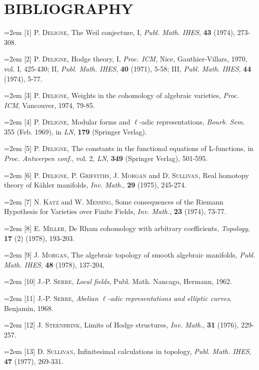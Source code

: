 \documentclass[11pt,leqno]{article}
\begin{document}
\section*{BIBLIOGRAPHY}

{\small
\noindent\hangindent=2em
[1] P. \textsc{Deligne}, The Weil conjecture, I, \textit{Publ. Math. IHES}, \textbf{43} (1974), 273-308.

\noindent\hangindent=2em
[2] P. \textsc{Deligne}, Hodge theory, I, \textit{Proc. ICM}, Nice, Gauthier-Villars, 1970, vol. I, 425-430; II, \textit{Publ. Math. IHES}, \textbf{40} (1971), 5-58; III, \textit{Publ. Math. IHES}, \textbf{44} (1974), 5-77.

\noindent\hangindent=2em
[3] P. \textsc{Deligne}, Weights in the cohomology of algebraic varieties, \textit{Proc. ICM}, Vancouver, 1974, 79-85.

\noindent\hangindent=2em
[4] P. \textsc{Deligne}, Modular forms and \(\ell\)-adic representations, \textit{Bourb. Sem.} 355 (Feb. 1969), in \textit{LN}, \textbf{179} (Springer Verlag).

\noindent\hangindent=2em
[5] P. \textsc{Deligne}, The constants in the functional equations of L-functions, in \textit{Proc. Antwerpen conf.}, vol. 2, \textit{LN}, \textbf{349} (Springer Verlag), 501-595.

\noindent\hangindent=2em
[6] P. \textsc{Deligne}, P. \textsc{Griffiths}, J. \textsc{Morgan} and D. \textsc{Sullivan}, Real homotopy theory of Kähler manifolds, \textit{Inv. Math.}, \textbf{29} (1975), 245-274.

\noindent\hangindent=2em
[7] N. \textsc{Katz} and W. \textsc{Messing}, Some consequences of the Riemann Hypothesis for Varieties over Finite Fields, \textit{Inv. Math.}, \textbf{23} (1974), 73-77.

\noindent\hangindent=2em
[8] E. \textsc{Miller}, De Rham cohomology with arbitrary coefficients, \textit{Topology}, \textbf{17} (2) (1978), 193-203.

\noindent\hangindent=2em
[9] J. \textsc{Morgan}, The algebraic topology of smooth algebraic manifolds, \textit{Publ. Math. IHES}, \textbf{48} (1978), 137-204,

\noindent\hangindent=2em
[10] J.-P. \textsc{Serre}, \textit{Local fields}, Publ. Math. Nancago, Hermann, 1962.

\noindent\hangindent=2em
[11] J.-P. \textsc{Serre}, \textit{Abelian \(\ell\)-adic representations and elliptic curves}, Benjamin, 1968.

\noindent\hangindent=2em
[12] J. \textsc{Steenbrink}, Limits of Hodge structures, \textit{Inv. Math.}, \textbf{31} (1976), 229-257.

\noindent\hangindent=2em
[13] D. \textsc{Sullivan}, Infinitesimal calculations in topology, \textit{Publ. Math. IHES}, \textbf{47} (1977), 269-331.
\par}
\end{document}
